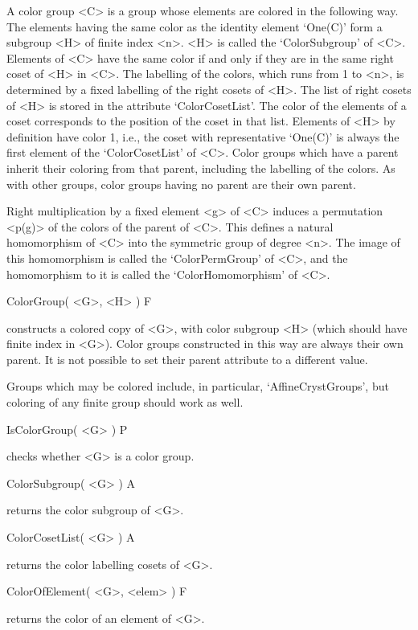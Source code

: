 
A color group <C> is a group whose elements are colored in the following 
way. The elements having the same color as the identity element `One(C)' 
form a subgroup <H> of finite index <n>. <H> is called the `ColorSubgroup' 
of <C>. Elements of <C> have the same color if and only if they are 
in the same right coset of <H> in <C>. The labelling of the colors,
which runs from 1 to <n>, is determined by a fixed labelling of the 
right cosets of <H>. The list of right cosets of <H> is stored in
the attribute `ColorCosetList'. The color of the elements of a 
coset corresponds to the position of the coset in that list. Elements 
of <H> by definition have color 1, i.e., the coset with representative 
`One(C)' is always the first element of the `ColorCosetList' of <C>. 
Color groups which have a parent inherit their coloring from that parent, 
including the labelling of the colors. As with other groups, color groups 
having no parent are their own parent.

Right multiplication by a fixed element <g> of <C> induces a permutation 
<p(g)> of the colors of the parent of <C>.  This defines a natural 
homomorphism of <C> into the symmetric group of degree <n>. The image 
of this homomorphism is called the `ColorPermGroup' of <C>, and the 
homomorphism to it is called the `ColorHomomorphism' of <C>.

\>ColorGroup( <G>, <H> ) F

constructs a colored copy of <G>, with color subgroup <H> (which
should have finite index in <G>). Color groups constructed in this way
are always their own parent. It is not possible to set their
parent attribute to a different value.

Groups which may be colored include, in particular, `AffineCrystGroups',  
but coloring of any finite group should work as well.

\>IsColorGroup( <G> ) P

checks whether <G> is a color group.

\>ColorSubgroup( <G> ) A

returns the color subgroup of <G>.

\>ColorCosetList( <G> ) A

returns the color labelling cosets of <G>.

\>ColorOfElement( <G>, <elem> ) F

returns the color of an element of <G>.

